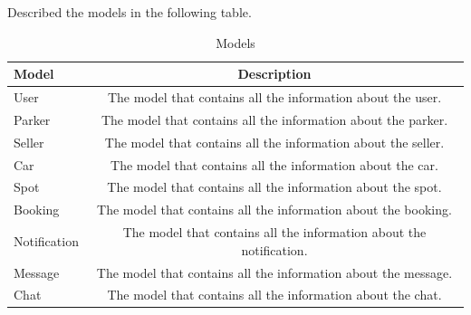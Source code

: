                     
                    Described the models in the following table.
                    \begin{table}[htb]
                        \centering
                        \begin{tabular}{ | l | c | }
                            \hline
                            Model & Description \\
                            \hline
                            \hline
                            User & The model that contains all the information about the user. \\
                            \hline
                            Parker & The model that contains all the information about the parker. \\
                            \hline
                            Seller & The model that contains all the information about the seller. \\
                            \hline
                            Car & The model that contains all the information about the car. \\
                            \hline
                            Spot & The model that contains all the information about the spot. \\
                            \hline
                            Booking & The model that contains all the information about the booking. \\
                            \hline
                            Notification & The model that contains all the information about the notification. \\
                            \hline
                            Message & The model that contains all the information about the message. \\
                            \hline
                            Chat & The model that contains all the information about the chat. \\
                            \hline
                        \end{tabular}
                        \caption{Models}
                        \label{tab:models}
                    \end{table}
